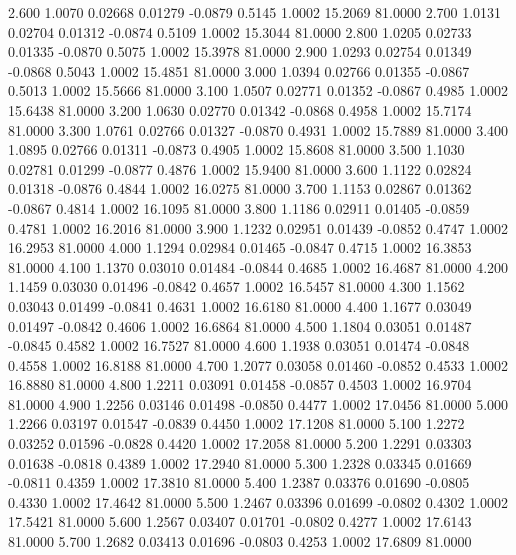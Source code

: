    2.600   1.0070   0.02668   0.01279  -0.0879   0.5145   1.0002  15.2069  81.0000
   2.700   1.0131   0.02704   0.01312  -0.0874   0.5109   1.0002  15.3044  81.0000
   2.800   1.0205   0.02733   0.01335  -0.0870   0.5075   1.0002  15.3978  81.0000
   2.900   1.0293   0.02754   0.01349  -0.0868   0.5043   1.0002  15.4851  81.0000
   3.000   1.0394   0.02766   0.01355  -0.0867   0.5013   1.0002  15.5666  81.0000
   3.100   1.0507   0.02771   0.01352  -0.0867   0.4985   1.0002  15.6438  81.0000
   3.200   1.0630   0.02770   0.01342  -0.0868   0.4958   1.0002  15.7174  81.0000
   3.300   1.0761   0.02766   0.01327  -0.0870   0.4931   1.0002  15.7889  81.0000
   3.400   1.0895   0.02766   0.01311  -0.0873   0.4905   1.0002  15.8608  81.0000
   3.500   1.1030   0.02781   0.01299  -0.0877   0.4876   1.0002  15.9400  81.0000
   3.600   1.1122   0.02824   0.01318  -0.0876   0.4844   1.0002  16.0275  81.0000
   3.700   1.1153   0.02867   0.01362  -0.0867   0.4814   1.0002  16.1095  81.0000
   3.800   1.1186   0.02911   0.01405  -0.0859   0.4781   1.0002  16.2016  81.0000
   3.900   1.1232   0.02951   0.01439  -0.0852   0.4747   1.0002  16.2953  81.0000
   4.000   1.1294   0.02984   0.01465  -0.0847   0.4715   1.0002  16.3853  81.0000
   4.100   1.1370   0.03010   0.01484  -0.0844   0.4685   1.0002  16.4687  81.0000
   4.200   1.1459   0.03030   0.01496  -0.0842   0.4657   1.0002  16.5457  81.0000
   4.300   1.1562   0.03043   0.01499  -0.0841   0.4631   1.0002  16.6180  81.0000
   4.400   1.1677   0.03049   0.01497  -0.0842   0.4606   1.0002  16.6864  81.0000
   4.500   1.1804   0.03051   0.01487  -0.0845   0.4582   1.0002  16.7527  81.0000
   4.600   1.1938   0.03051   0.01474  -0.0848   0.4558   1.0002  16.8188  81.0000
   4.700   1.2077   0.03058   0.01460  -0.0852   0.4533   1.0002  16.8880  81.0000
   4.800   1.2211   0.03091   0.01458  -0.0857   0.4503   1.0002  16.9704  81.0000
   4.900   1.2256   0.03146   0.01498  -0.0850   0.4477   1.0002  17.0456  81.0000
   5.000   1.2266   0.03197   0.01547  -0.0839   0.4450   1.0002  17.1208  81.0000
   5.100   1.2272   0.03252   0.01596  -0.0828   0.4420   1.0002  17.2058  81.0000
   5.200   1.2291   0.03303   0.01638  -0.0818   0.4389   1.0002  17.2940  81.0000
   5.300   1.2328   0.03345   0.01669  -0.0811   0.4359   1.0002  17.3810  81.0000
   5.400   1.2387   0.03376   0.01690  -0.0805   0.4330   1.0002  17.4642  81.0000
   5.500   1.2467   0.03396   0.01699  -0.0802   0.4302   1.0002  17.5421  81.0000
   5.600   1.2567   0.03407   0.01701  -0.0802   0.4277   1.0002  17.6143  81.0000
   5.700   1.2682   0.03413   0.01696  -0.0803   0.4253   1.0002  17.6809  81.0000
